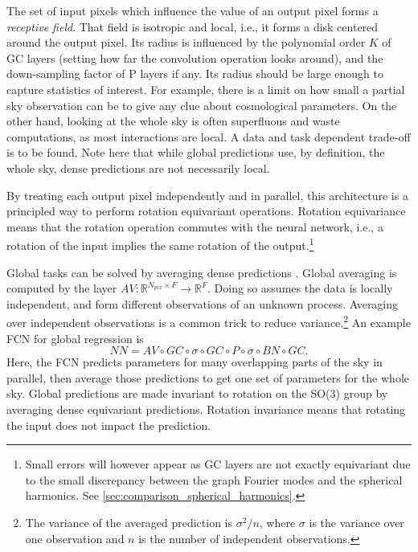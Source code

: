 \documentclass[final,twocolumn,3p,times,sort&compress]{elsarticle}
\newcommand{\1}{\b{1}}              %
\newcommand{\0}{\b{0}}              %
\newcommand{\R}{\mathbb{R}}
\begin{document}
The set of input pixels which influence the value of an output pixel forms a \textit{receptive field}.
That field is isotropic and local, i.e., it forms a disk centered around the output pixel.
Its radius is influenced by the polynomial order $K$ of GC layers (setting how far the convolution operation looks around), and the down-sampling factor of P layers if any.
Its radius should be large enough to capture statistics of interest.
For example, there is a limit on how small a partial sky observation can be to give any clue about cosmological parameters.
On the other hand, looking at the whole sky is often superfluous and waste computations, as most interactions are local.
A data and task dependent trade-off is to be found.
Note here that while global predictions use, by definition, the whole sky, dense predictions are not necessarily local.

By treating each output pixel independently and in parallel, this architecture is a principled way to perform rotation equivariant operations.
Rotation equivariance means that the rotation operation commutes with the neural network, i.e., a rotation of the input implies the same rotation of the output.\footnote{Small errors will however appear as GC layers are not exactly equivariant due to the small discrepancy between the graph Fourier modes and the spherical harmonics. See \ref{sec:comparison_spherical_harmonics}.}


Global tasks can be solved by averaging dense predictions \citep{lin2013globalavgpooling, springenberg2014allconv}.
Global averaging is computed by the layer $AV: \R^{N_{pix} \times F} \rightarrow \R^F$.
Doing so assumes the data is locally independent, and form different observations of an unknown process.
Averaging over independent observations is a common trick to reduce variance.\footnote{The variance of the averaged prediction is $\sigma^2 / n$, where $\sigma$ is the variance over one observation and $n$ is the number of independent observations.}
An example FCN for global regression is
\begin{equation*}
	NN = AV \circ GC \circ \sigma \circ GC \circ P \circ \sigma \circ BN \circ GC.
\end{equation*}
Here, the FCN predicts parameters for many overlapping parts of the sky in parallel, then average those predictions to get one set of parameters for the whole sky.
Global predictions are made invariant to rotation on the SO(3) group by averaging dense equivariant predictions.
Rotation invariance means that rotating the input does not impact the prediction.
\end{document}
